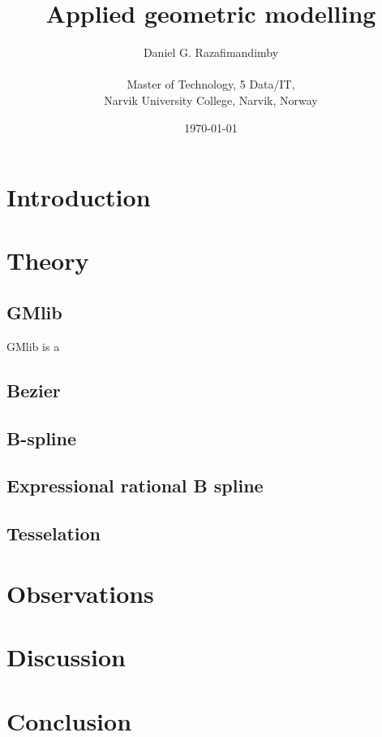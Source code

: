 \documentclass[a4paper,11pt]{article}
\title{Applied geometric modelling}
\author{
  Daniel G. Razafimandimby \\ \\
  Master of Technology, 5 Data/IT, \\
  Narvik University College, Narvik, Norway
}
\date{\today}
\begin{document}
\maketitle

\begin{abstract}

\end{abstract}


\section{Introduction}

\section{Theory}
\subsection{GMlib}
GMlib is a 
\subsection{Bezier}
\subsection{B-spline}
\subsection{Expressional rational B spline}
\subsection{Tesselation}

\section{Observations}

\section{Discussion}

\section{Conclusion}

%
%
\end{document}
